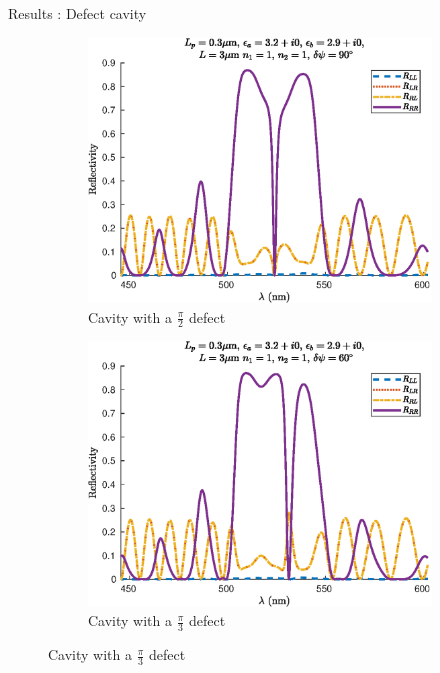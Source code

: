 \documentclass[aspectratio=169]{beamer}
\begin{document}
\begin{frame}{Results : Defect cavity}
\begin{figure}
\begin{subfigure}{0.32\textwidth}
			\includegraphics[width=\linewidth]{plots/defect/reflectivity/oseen_reflection}
			\caption{Cavity with a $\frac{\pi}{2}$ defect}
		\end{subfigure}
		\begin{subfigure}{0.32\textwidth}
			\centering
			\includegraphics[width=\linewidth]{plots/defect/reflectivity_other_defect/oseen_reflection}
			\caption{Cavity with a $\frac{\pi}{3}$ defect}
		\end{subfigure}
	\end{figure}
\end{frame}
\end{document}
